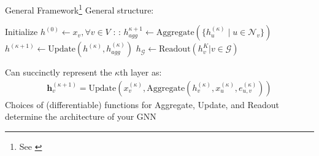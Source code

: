 \documentclass{beamer}
\newcommand{\nhood}{\mathcal{N}}
\newcommand{\Graph}{\mathcal{G}}
\newcommand{\NodeSet}{V}
\newcommand{\node}{v}
\newcommand{\nrepresent}{h}
\newcommand{\edge}{e}
\newcommand{\iter}{\kappa}
\newcommand{\Iter}{K}
\begin{document}
\begin{frame}{}
\begin{columns}[T]
\begin{column}{0.4\textwidth}
    \end{column}
    \begin{column}{0.3\textwidth}
    \end{column}
    \end{columns}

\end{frame}




\begin{frame}{
    General Framework\footnote{See \cite{ektefaie_multimodal_2023,xu_how_2019}}
    }
    General structure: 
    \begin{algorithmic}[1]
    \State Initialize $\nrepresent^{(0)} \gets x_\node, \forall \node \in \NodeSet$ 
        \For{$\iter = 0, ..., \Iter$}:
            \For{$\node \in \Graph$}:
            \State $\nrepresent_{agg}^{\iter+1} \gets \text{Aggregate}(\{h_u^{(\iter)} \mid u \in \nhood_\node\})$
            \State $\nrepresent^{(\iter+1)} \gets \text{Update}(\nrepresent^{(\iter)}, \nrepresent_{agg}^{(\iter)})$
            \EndFor
        \EndFor
        \State $h_\Graph \gets \text{Readout}(h^\Iter_\node | \node \in \Graph)$
    \end{algorithmic}
\vspace{2mm}
Can succinctly represent the $\iter$th layer as: 
\begin{gather*}
    \mathbf{h}_\node^{(\iter+1)} 
    =
    \text{Update}
    \left( 
    x_\node^{(\iter)}
    ,   
    \text{Aggregate}
    (
        h_\node^{(\iter)}, x_u^{(\iter)}, \edge_{u,\node}^{(\iter)}
    )
    \right)
\end{gather*}
\vspace{2mm}
Choices of (differentiable) functions for Aggregate, Update, and Readout determine the architecture of your GNN 
\end{frame}
\end{document}
